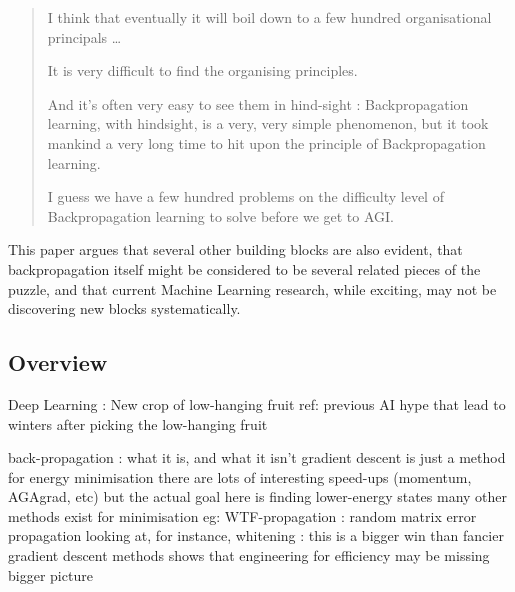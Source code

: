 \documentclass{llncs}
\begin{document}
\begin{quotation}

I think that 
eventually it will boil down to a few hundred organisational principals
\dots



It is very difficult to find the organising principles.

And it's often very easy to see them in hind-sight : 
Backpropagation learning, with hindsight, is a very, very simple phenomenon, 
but it took mankind a  very long time to hit upon the principle of Backpropagation learning. 

I guess we have a few hundred problems on the difficulty level of Backpropagation learning to solve before we get to AGI. 


\end{quotation}

This paper argues that several other building blocks are also evident, 
that backpropagation itself might be considered to be several related pieces of the puzzle,
and that current Machine Learning research, while exciting, may not be
discovering new blocks systematically.

\subsection{Overview}

Deep Learning : 
  New crop of low-hanging fruit 
    ref: previous AI hype that lead to winters after picking the low-hanging fruit

back-propagation : what it is, and what it isn't
  gradient descent is just a method for energy minimisation
    there are lots of interesting speed-ups (momentum, AGAgrad, etc)
    but the actual goal here is finding lower-energy states
  many other methods exist for minimisation
    eg: WTF-propagation : random matrix error propagation
  looking at, for instance, whitening : this is a bigger win than fancier gradient descent methods
    shows that engineering for efficiency may be missing bigger picture
  
\end{document}
